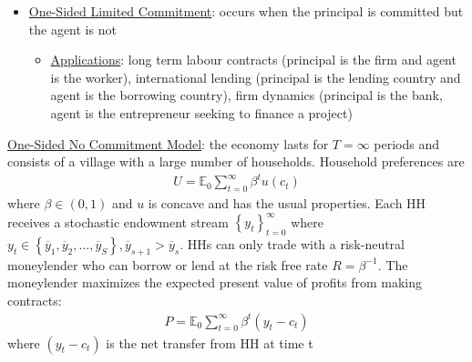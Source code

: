 \documentclass{article}
\begin{document}
\begin{itemize}
    \item  \underline{One-Sided Limited Commitment}: occurs when the principal is committed but the agent is not
    \begin{itemize}
        \item \underline{Applications}: long term labour contracts (principal is the firm and agent is the worker), international lending (principal is the lending country and agent is the borrowing country), firm dynamics (principal is the bank, agent is the entrepreneur seeking to finance a project)
    \end{itemize}
\end{itemize}
\vspace{2.5mm}
\par \underline{One-Sided No Commitment Model}: the economy lasts for $T = \infty$ periods and consists of a village with a large number of households. Household preferences are
\begin{gather*}
    U = \mathbb{E}_{0} \sum_{t = 0}^{\infty} \beta^{t} u(c_{t})
\end{gather*}
where $\beta \in (0, 1)$ and $u$ is concave and has the usual properties. Each HH receives a stochastic endowment stream $\left\{y_{t}\right\}_{t=0}^{\infty}$ where $y_{t} \in \left\{ \overline{y}_{1}, \overline{y}_{2}, \dots, \overline{y}_{S} \right\}, \overline{y}_{s+1} > \overline{y}_{s}$. HHs can only trade with a risk-neutral moneylender who can borrow or lend at the risk free rate $R = \beta^{-1}$. The moneylender maximizes the expected present value of profits from making contracts:
\begin{gather*}
    P = \mathbb{E}_{0} \sum_{t=0}^{\infty} \beta^{t} (y_{t} - c_{t})
\end{gather*}
where $(y_{t} - c_{t})$ is the net transfer from HH at time t
\end{document}
